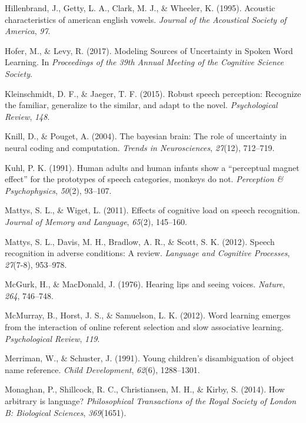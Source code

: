 \documentclass[english,floatsintext,man]{apa6}
\theoremstyle{definition}
\theoremstyle{definition}
\theoremstyle{definition}
\theoremstyle{remark}
\begin{document}
\hypertarget{ref-hillenbrand1995}{}
Hillenbrand, J., Getty, L. A., Clark, M. J., \& Wheeler, K. (1995).
Acoustic characteristics of american english vowels. \emph{Journal of
the Acoustical Society of America}, \emph{97}.

\hypertarget{ref-hofer2017}{}
Hofer, M., \& Levy, R. (2017). Modeling Sources of Uncertainty in Spoken
Word Learning. In \emph{Proceedings of the 39th Annual Meeting of the
Cognitive Science Society}.

\hypertarget{ref-kleinschmidt2015}{}
Kleinschmidt, D. F., \& Jaeger, T. F. (2015). Robust speech perception:
Recognize the familiar, generalize to the similar, and adapt to the
novel. \emph{Psychological Review}, \emph{148}.

\hypertarget{ref-Knill04}{}
Knill, D., \& Pouget, A. (2004). The bayesian brain: The role of
uncertainty in neural coding and computation. \emph{Trends in
Neurosciences}, \emph{27}(12), 712--719.

\hypertarget{ref-kuhl1991}{}
Kuhl, P. K. (1991). Human adults and human infants show a ``perceptual
magnet effect'' for the prototypes of speech categories, monkeys do not.
\emph{Perception \& Psychophysics}, \emph{50}(2), 93--107.

\hypertarget{ref-mattys11}{}
Mattys, S. L., \& Wiget, L. (2011). Effects of cognitive load on speech
recognition. \emph{Journal of Memory and Language}, \emph{65}(2),
145--160.

\hypertarget{ref-mattys12}{}
Mattys, S. L., Davis, M. H., Bradlow, A. R., \& Scott, S. K. (2012).
Speech recognition in adverse conditions: A review. \emph{Language and
Cognitive Processes}, \emph{27}(7-8), 953--978.

\hypertarget{ref-mcgurk1976}{}
McGurk, H., \& MacDonald, J. (1976). Hearing lips and seeing voices.
\emph{Nature}, \emph{264}, 746--748.

\hypertarget{ref-mcmurray2012}{}
McMurray, B., Horst, J. S., \& Samuelson, L. K. (2012). Word learning
emerges from the interaction of online referent selection and slow
associative learning. \emph{Psychological Review}, \emph{119}.

\hypertarget{ref-Merriman91}{}
Merriman, W., \& Schuster, J. (1991). Young children's disambiguation of
object name reference. \emph{Child Development}, \emph{62}(6),
1288--1301.

\hypertarget{ref-Monaghan2014}{}
Monaghan, P., Shillcock, R. C., Christiansen, M. H., \& Kirby, S.
(2014). How arbitrary is language? \emph{Philosophical Transactions of
the Royal Society of London B: Biological Sciences}, \emph{369}(1651).
\end{document}
